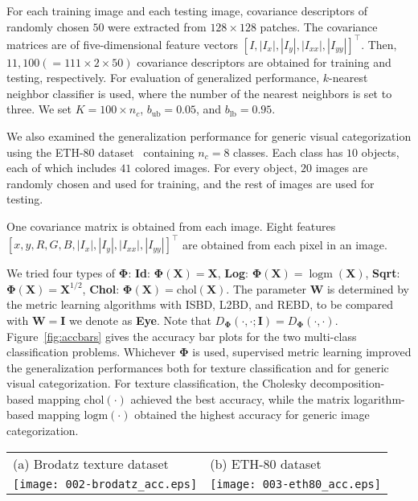 \documentclass[10pt,onecolumn]{article}
\theoremstyle{definition}
\theoremstyle{definition}
\theoremstyle{definition}
\theoremstyle{definition}
\theoremstyle{definition}
\theoremstyle{theorem}
\newcommand{\0}{{\bm{0}}}
\newcommand{\1}{{\bm{1}}}
\newcommand{\vI}{{\bm{I}}}
\newcommand{\vW}{{\bm{W}}}
\newcommand{\X}{{\bm{X}}}
\newcommand{\vPhi}{{\bm{\Phi}}}
\DeclareMathOperator{\logm}{logm}
\begin{document}
For each training image and each testing image, covariance
descriptors of randomly chosen $50$ were extracted from
$128\times 128$ patches. The covariance matrices are of
five-dimensional feature vectors
$\left[I,|I_{x}|,|I_{y}|,|I_{xx}|,|I_{yy}|\right]^\top$.
Then, $11,100(=111\times 2 \times 50)$ covariance
descriptors are obtained for training and testing,
respectively. For evaluation of generalized performance,
$k$-nearest neighbor classifier is used, where the number of
the nearest neighbors is set to three. We set $K=100\times
n_{c}$, $b_{\text{ub}}=0.05$, and $b_{\text{lb}}=0.95$.

We also examined the generalization performance for generic
visual categorization using the ETH-80 dataset~\cite{leibe2003analyzing} containing
$n_{c}=8$ classes. Each class has $10$ objects, each of which includes $41$
colored images. For every
object, $20$ images are randomly chosen and used for
training, and the rest of images are used for testing.

One covariance matrix is obtained from each image. Eight
features $\left[x, y, R, G, B,
|I_{x}|,|I_{y}|,|I_{xx}|,|I_{yy}|\right]^\top$ are obtained
from each pixel in an image.

We tried four types of $\vPhi$:
\textbf{Id}: $\vPhi(\X)=\X$,
\textbf{Log}: $\vPhi(\X)=\logm(\X)$,
\textbf{Sqrt}: $\vPhi(\X)=\X^{1/2}$,
\textbf{Chol}: $\vPhi(\X)=\text{chol}(\X)$.
The parameter $\vW$ is determined
by the metric learning algorithms with
ISBD, L2BD, and REBD, to be compared with $\vW=\vI$ we denote as \textbf{Eye}.
Note that $D_{\vPhi}(\cdot,\cdot;\vI)=D_{\vPhi}(\cdot,\cdot)$.
Figure~\ref{fig:accbars} gives the accuracy bar plots for the two
multi-class classification problems. Whichever $\vPhi$ is
used, supervised metric learning improved the generalization
performances both for texture classification and for generic
visual categorization. For texture classification, the
Cholesky decomposition-based mapping $\text{chol}(\cdot)$
achieved the best accuracy, while the matrix logarithm-based mapping
$\text{logm}(\cdot)$ obtained the highest accuracy for generic image
categorization.


\begin{figure*}[t!]
\begin{center}
  \begin{tabular}{ll}
    (a) Brodatz texture dataset
    & (b) ETH-80  dataset
    \\
    \texttt{[image: 002-brodatz\_acc.eps]}
    &
    \texttt{[image: 003-eth80\_acc.eps]}
\end{tabular}
\end{center}
\caption{Generalized performances for pattern recognition. \label{fig:accbars}}
\end{figure*}
\end{document}
